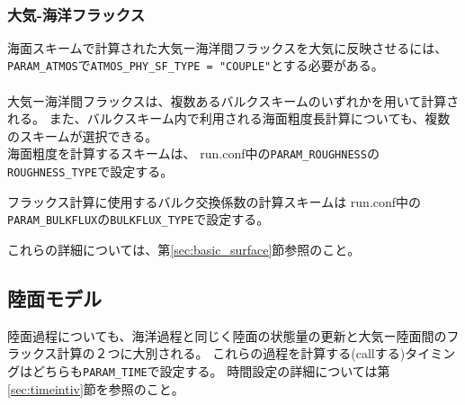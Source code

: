 \\

\subsubsection{大気-海洋フラックス}
海面スキームで計算された大気ー海洋間フラックスを大気に反映させるには、\verb|PARAM_ATMOS|で\verb|ATMOS_PHY_SF_TYPE = "COUPLE"|とする必要がある。\\

\\

大気ー海洋間フラックスは、複数あるバルクスキームのいずれかを用いて計算される。
また、バルクスキーム内で利用される海面粗度長計算についても、複数のスキームが選択できる。\\

海面粗度を計算するスキームは、
run.conf中の\verb|PARAM_ROUGHNESS|の\verb|ROUGHNESS_TYPE|で設定する。

フラックス計算に使用するバルク交換係数の計算スキームは
run.conf中の\verb|PARAM_BULKFLUX|の\verb|BULKFLUX_TYPE|で設定する。

これらの詳細については、第\ref{sec:basic_surface}節参照のこと。



\subsection{陸面モデル} \label{sec:basic_land}
陸面過程についても、海洋過程と同じく陸面の状態量の更新と大気ー陸面間のフラックス計算の２つに大別される。
これらの過程を計算する(callする)タイミングはどちらも\verb|PARAM_TIME|で設定する。
時間設定の詳細については第\ref{sec:timeintiv}節を参照のこと。\\


